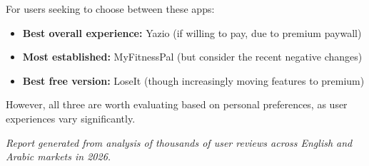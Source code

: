 \documentclass[12pt, a4paper]{article}
\begin{document}
For users seeking to choose between these apps:
\begin{itemize}
    \item \textbf{Best overall experience:} Yazio (if willing to pay, due to premium paywall)
    \item \textbf{Most established:} MyFitnessPal (but consider the recent negative changes)
    \item \textbf{Best free version:} LoseIt (though increasingly moving features to premium)
\end{itemize}

However, all three are worth evaluating based on personal preferences, as user experiences vary significantly.

\vspace{1cm}

\begin{center}
\textit{Report generated from analysis of thousands of user reviews across English and Arabic markets in 2026.}
\end{center}
\end{document}
